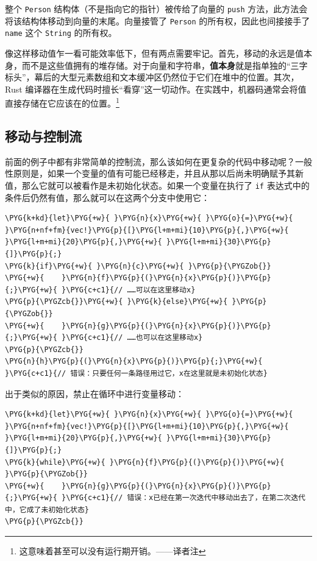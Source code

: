整个 \texttt{Person} 结构体（不是指向它的指针）被传给了向量的 \texttt{push} 方法，此方法会将该结构体移动到向量的末尾。向量接管了 \texttt{Person} 的所有权，因此也间接接手了 \texttt{name} 这个 \texttt{String} 的所有权。

像这样移动值乍一看可能效率低下，但有两点需要牢记。首先，移动的永远是值本身，而不是这些值拥有的堆存储。对于向量和字符串，\textbf{值本身}就是指单独的“三字标头”，幕后的大型元素数组和文本缓冲区仍然位于它们在堆中的位置。其次，Rust 编译器在生成代码时擅长“看穿”这一切动作。在实践中，机器码通常会将值直接存储在它应该在的位置。\footnote{这意味着甚至可以没有运行期开销。——译者注}

\subsection{移动与控制流}

前面的例子中都有非常简单的控制流，那么该如何在更复杂的代码中移动呢？一般性原则是，如果一个变量的值有可能已经移走，并且从那以后尚未明确赋予其新值，那么它就可以被看作是未初始化状态。如果一个变量在执行了 \texttt{if} 表达式中的条件后仍然有值，那么就可以在这两个分支中使用它：

\begin{Verbatim}[commandchars=\\\{\},breaklines=true,breakanywhere=true,fontsize=\codefont,xleftmargin=17bp]
\PYG{k+kd}{let}\PYG{+w}{ }\PYG{n}{x}\PYG{+w}{ }\PYG{o}{=}\PYG{+w}{ }\PYG{n+nf+fm}{vec!}\PYG{p}{[}\PYG{l+m+mi}{10}\PYG{p}{,}\PYG{+w}{ }\PYG{l+m+mi}{20}\PYG{p}{,}\PYG{+w}{ }\PYG{l+m+mi}{30}\PYG{p}{]}\PYG{p}{;}
\PYG{k}{if}\PYG{+w}{ }\PYG{n}{c}\PYG{+w}{ }\PYG{p}{\PYGZob{}}
\PYG{+w}{    }\PYG{n}{f}\PYG{p}{(}\PYG{n}{x}\PYG{p}{)}\PYG{p}{;}\PYG{+w}{ }\PYG{c+c1}{// ……可以在这里移动x}
\PYG{p}{\PYGZcb{}}\PYG{+w}{ }\PYG{k}{else}\PYG{+w}{ }\PYG{p}{\PYGZob{}}
\PYG{+w}{    }\PYG{n}{g}\PYG{p}{(}\PYG{n}{x}\PYG{p}{)}\PYG{p}{;}\PYG{+w}{ }\PYG{c+c1}{// ……也可以在这里移动x}
\PYG{p}{\PYGZcb{}}
\PYG{n}{h}\PYG{p}{(}\PYG{n}{x}\PYG{p}{)}\PYG{p}{;}\PYG{+w}{ }\PYG{c+c1}{// 错误：只要任何一条路径用过它，x在这里就是未初始化状态}
\end{Verbatim}

出于类似的原因，禁止在循环中进行变量移动：

\begin{Verbatim}[commandchars=\\\{\},breaklines=true,breakanywhere=true,fontsize=\codefont,xleftmargin=17bp]
\PYG{k+kd}{let}\PYG{+w}{ }\PYG{n}{x}\PYG{+w}{ }\PYG{o}{=}\PYG{+w}{ }\PYG{n+nf+fm}{vec!}\PYG{p}{[}\PYG{l+m+mi}{10}\PYG{p}{,}\PYG{+w}{ }\PYG{l+m+mi}{20}\PYG{p}{,}\PYG{+w}{ }\PYG{l+m+mi}{30}\PYG{p}{]}\PYG{p}{;}
\PYG{k}{while}\PYG{+w}{ }\PYG{n}{f}\PYG{p}{(}\PYG{p}{)}\PYG{+w}{ }\PYG{p}{\PYGZob{}}
\PYG{+w}{    }\PYG{n}{g}\PYG{p}{(}\PYG{n}{x}\PYG{p}{)}\PYG{p}{;}\PYG{+w}{ }\PYG{c+c1}{// 错误：x已经在第一次迭代中移动出去了，在第二次迭代中，它成了未初始化状态}
\PYG{p}{\PYGZcb{}}
\end{Verbatim}


